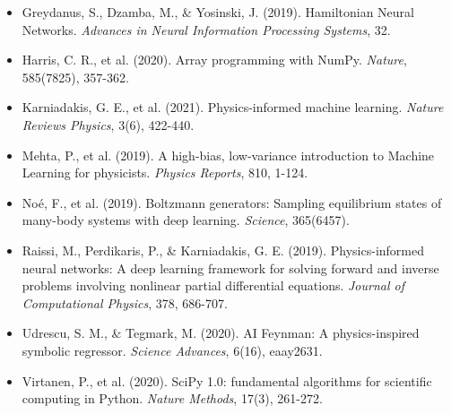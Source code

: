 \begin{itemize}[leftmargin=1.5cm]
    \item Greydanus, S., Dzamba, M., \& Yosinski, J. (2019). Hamiltonian Neural Networks. \textit{Advances in Neural Information Processing Systems}, 32.
    \item Harris, C. R., et al. (2020). Array programming with NumPy. \textit{Nature}, 585(7825), 357-362.
    \item Karniadakis, G. E., et al. (2021). Physics-informed machine learning. \textit{Nature Reviews Physics}, 3(6), 422-440.
    \item Mehta, P., et al. (2019). A high-bias, low-variance introduction to Machine Learning for physicists. \textit{Physics Reports}, 810, 1-124.
    \item Noé, F., et al. (2019). Boltzmann generators: Sampling equilibrium states of many-body systems with deep learning. \textit{Science}, 365(6457).
    \item Raissi, M., Perdikaris, P., \& Karniadakis, G. E. (2019). Physics-informed neural networks: A deep learning framework for solving forward and inverse problems involving nonlinear partial differential equations. \textit{Journal of Computational Physics}, 378, 686-707.
    \item Udrescu, S. M., \& Tegmark, M. (2020). AI Feynman: A physics-inspired symbolic regressor. \textit{Science Advances}, 6(16), eaay2631.
    \item Virtanen, P., et al. (2020). SciPy 1.0: fundamental algorithms for scientific computing in Python. \textit{Nature Methods}, 17(3), 261-272.
\end{itemize}
